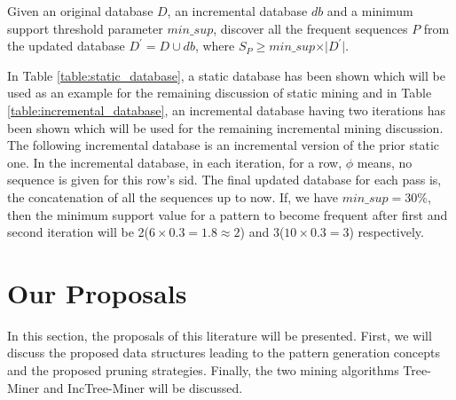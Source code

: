 \begin{definition} \label{definition:ispm}
    Given an original database $D$, an incremental database $db$ and a minimum support threshold parameter $min\_sup$, discover all the frequent sequences $P$ from the updated database $D^{\prime}=D \cup db$, where $S_{P} \geq min\_sup \times \vert D^{\prime} \vert.$
\end{definition}
In Table \ref{table:static_database}, a static database has been shown which will be used as an example for the remaining discussion of static mining and in Table \ref{table:incremental_database}, an incremental database having two iterations has been shown which will be used for the remaining incremental mining discussion. The following incremental database is an incremental version of the prior static one. In the incremental database, in each iteration, for a row, $\phi$ means, no sequence is given for this row's sid. The final updated database for each pass is, the concatenation of all the sequences up to now. If, we have $min\_sup=30\%$, then the minimum support value for a pattern to become frequent after first and second iteration will be 2($6 \times 0.3=1.8 \approx 2$) and 3($10 \times 0.3=3$) respectively. 




\section{Our Proposals} \label{proposals}
In this section, the proposals of this literature will be presented. First, we will discuss the proposed data structures leading to the pattern generation concepts and the proposed pruning strategies. Finally, the two mining algorithms Tree-Miner and IncTree-Miner will be discussed. 


